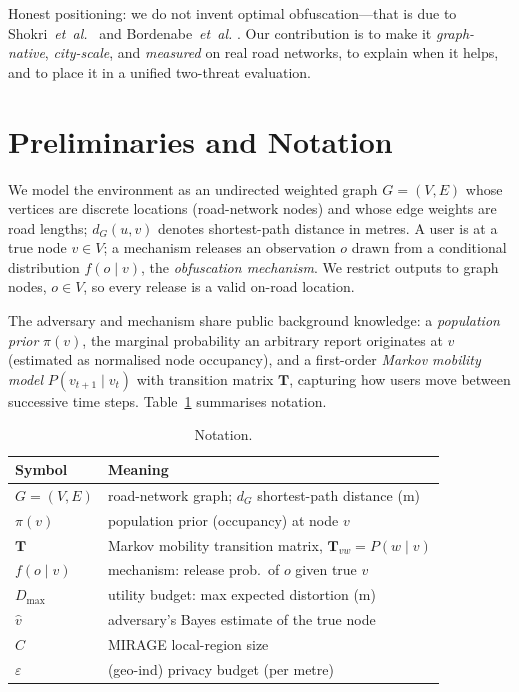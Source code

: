 \documentclass[10pt,journal,compsoc]{IEEEtran}
\newcommand{\dG}{d_{G}}
\begin{document}
Honest positioning: we do not invent optimal obfuscation---that is due to
Shokri~\emph{et~al.}~\cite{shokri2012,shokri2015pets} and Bordenabe~\emph{et~al.}
\cite{bordenabe2014}. Our contribution is to make it \emph{graph-native},
\emph{city-scale}, and \emph{measured} on real road networks, to explain when it
helps, and to place it in a unified two-threat evaluation.

\section{Preliminaries and Notation}
\label{sec:prelim}
We model the environment as an undirected weighted graph $G=(V,E)$ whose vertices
are discrete locations (road-network nodes) and whose edge weights are road
lengths; $\dG(u,v)$ denotes shortest-path distance in metres. A user is at a true
node $v\in V$; a mechanism releases an observation $o$ drawn from a conditional
distribution $f(o\mid v)$, the \emph{obfuscation mechanism}. We restrict outputs
to graph nodes, $o\in V$, so every release is a valid on-road location.

The adversary and mechanism share public background knowledge: a \emph{population
prior} $\pi(v)$, the marginal probability an arbitrary report originates at $v$
(estimated as normalised node occupancy), and a first-order \emph{Markov mobility
model} $P(v_{t+1}\mid v_t)$ with transition matrix $\mathbf{T}$, capturing how
users move between successive time steps. Table~\ref{tab:notation} summarises
notation.

\begin{table}[t]\centering
\caption{Notation.}
\label{tab:notation}
\begin{tabular}{ll}
\toprule
Symbol & Meaning \\
\midrule
$G=(V,E)$ & road-network graph; $\dG$ shortest-path distance (m) \\
$\pi(v)$ & population prior (occupancy) at node $v$ \\
$\mathbf{T}$ & Markov mobility transition matrix, $\mathbf{T}_{vw}=P(w\mid v)$ \\
$f(o\mid v)$ & mechanism: release prob.\ of $o$ given true $v$ \\
$D_{\max}$ & utility budget: max expected distortion (m) \\
$\hat v$ & adversary's Bayes estimate of the true node \\
$C$ & MIRAGE local-region size \\
$\varepsilon$ & (geo-ind) privacy budget (per metre) \\
\bottomrule
\end{tabular}
\end{table}
\end{document}
